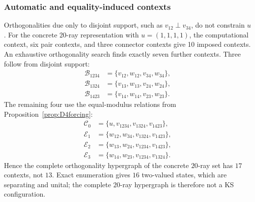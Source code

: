 \documentclass[%
  reprint,
  superscriptaddress,
  showkeys,
  amsmath,amssymb,
  aps,pra,
  longbibliography,
  floatfix,
  x11names
]{revtex4-2}
\begin{document}
\subsubsection{Automatic and equality-induced contexts}
Orthogonalities due only to disjoint support, such as $v_{12}\perp v_{34}$, do not constrain $u$.  For the concrete 20-ray representation with $u=(1,1,1,1)$, the computational context, six pair contexts, and three connector contexts give 10 imposed contexts.  An exhaustive orthogonality search finds exactly seven further contexts.  Three follow from disjoint support:
\begin{align*}
\mathcal{B}_{1234}&=\{v_{12},w_{12},v_{34},w_{34}\},\\
\mathcal{B}_{1324}&=\{v_{13},w_{13},v_{24},w_{24}\},\\
\mathcal{B}_{1423}&=\{v_{14},w_{14},v_{23},w_{23}\}.
\end{align*}
The remaining four use the equal-modulus relations from Proposition~\ref{prop:D4forcing}:
\begin{align*}
\mathcal{C}_0&=\{u,v_{1234},v_{1324},v_{1423}\},\\
\mathcal{E}_1&=\{w_{12},w_{34},v_{1324},v_{1423}\},\\
\mathcal{E}_2&=\{w_{13},w_{24},v_{1234},v_{1423}\},\\
\mathcal{E}_3&=\{w_{14},w_{23},v_{1234},v_{1324}\}.
\end{align*}
Hence the complete orthogonality hypergraph of the concrete $20$-ray set has $17$ contexts, not $13$.  Exact enumeration gives $16$ two-valued states, which are separating and unital; the complete $20$-ray hypergraph is therefore not a KS configuration.
\end{document}
